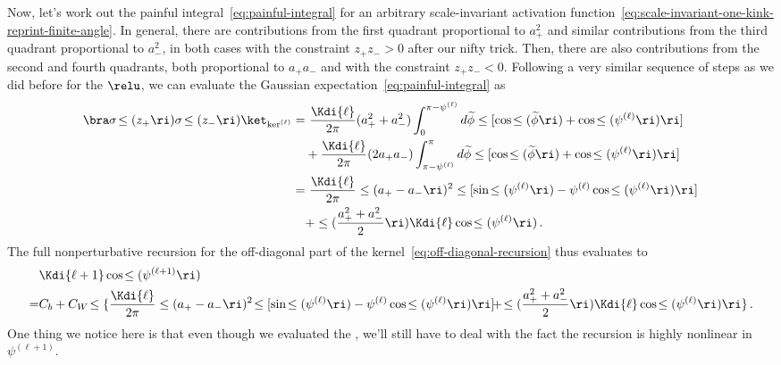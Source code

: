 Now, let's work out the painful integral~\eqref{eq:painful-integral} for an arbitrary scale-invariant activation function~\eqref{eq:scale-invariant-one-kink-reprint-finite-angle}.
In general, there are contributions from the first quadrant proportional to $a_+^2$ and similar contributions from the third quadrant proportional to $a_{-}^2$, in both cases with the constraint $z_{+}z_{-}>0$ after our nifty trick.
Then, there are also contributions from the second and fourth quadrants, both proportional to $a_{+}a_{-}$ and with the constraint $z_{+}z_{-}<0$. Following a very similar sequence of steps as we did before for the $\relu$, we can evaluate the Gaussian expectation~\eqref{eq:painful-integral} as
\begin{align}\label{eq:evaluated-gaussian-expectation}
\bra\sigma\!\le(z_{+}\ri)\sigma\!\le(z_{-}\ri)\ket_{\ker^{(\ell)}}=&\ \frac{\Kdi{\ell}}{2\pi}(a_{+}^2+a_{-}^2)\int_{0}^{\pi-\psi^{(\ell)} } d\widetilde{\phi} \le[\cos\!\le(\widetilde{\phi}\ri)+\cos\!\le(\psi^{(\ell)}\ri)\ri]\, \\
&+\frac{\Kdi{\ell}}{2\pi}(2a_{+}a_{-})\int_{\pi-\psi^{(\ell)} }^{\pi} d\widetilde{\phi} \le[\cos\!\le(\widetilde{\phi}\ri)+\cos\!\le(\psi^{(\ell)}\ri)\ri]\, \notag\\
=&\ \frac{\Kdi{\ell}}{2\pi}\le(a_{+}-a_{-}\ri)^2\le[\sin\!\le(\psi^{(\ell)}\ri)-\psi^{(\ell)}\cos\!\le(\psi^{(\ell)}\ri)\ri]\, \notag\\
&+\le(\frac{a_{+}^2+a_{-}^2}{2}\ri)\Kdi{\ell}\cos\!\le(\psi^{(\ell)}\ri) \, .\notag
\end{align}
The full nonperturbative recursion for the off-diagonal part of the kernel~\eqref{eq:off-diagonal-recursion} thus evaluates to
\begin{align}\label{eq:off-diagonal-recursion-integrated}
&\Kdi{\ell+1}\cos\!\le(\psi^{(\ell+1)}\ri)\\
=&C_b+C_W\! \le\{ \frac{\Kdi{\ell}}{2\pi}\le(a_{+}-a_{-}\ri)^2\!\le[\sin\!\le(\psi^{(\ell)}\ri)-\psi^{(\ell)}\cos\!\le(\psi^{(\ell)}\ri)\ri]\! +\!\le(\frac{a_{+}^2+a_{-}^2}{2}\ri)\Kdi{\ell}\cos\!\le(\psi^{(\ell)}\ri) \ri\} \, . \notag
\end{align}
One thing we notice here is that even though we evaluated the , we'll still have to deal with the fact the recursion is highly nonlinear in $\psi^{(\ell+1)}$.

